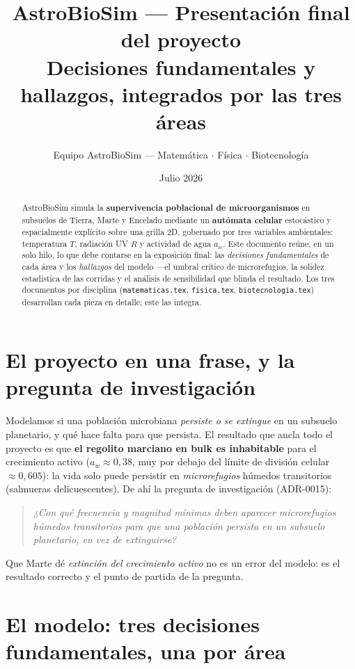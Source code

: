 \documentclass[11pt]{article}
\title{\textbf{AstroBioSim — Presentación final del proyecto}\\[3pt]
\large Decisiones fundamentales y hallazgos, integrados por las tres áreas}
\author{Equipo AstroBioSim — Matemática $\cdot$ Física $\cdot$ Biotecnología}
\date{Julio 2026}
\begin{document}
\maketitle

\begin{abstract}
\noindent AstroBioSim simula la \textbf{supervivencia poblacional de
microorganismos} en subsuelos de Tierra, Marte y Encelado mediante un
\textbf{autómata celular} estocástico y espacialmente explícito sobre una grilla
2D, gobernado por tres variables ambientales: temperatura $T$, radiación UV $R$ y
actividad de agua $a_w$. Este documento reúne, en un solo hilo, lo que debe
contarse en la exposición final: las \emph{decisiones fundamentales} de cada área
y los \emph{hallazgos} del modelo —el umbral crítico de microrefugios, la solidez
estadística de las corridas y el análisis de sensibilidad que blinda el resultado.
Los tres documentos por disciplina (\texttt{matematicas.tex}, \texttt{fisica.tex},
\texttt{biotecnologia.tex}) desarrollan cada pieza en detalle; este las integra.
\end{abstract}

\section{El proyecto en una frase, y la pregunta de investigación}

Modelamos si una población microbiana \emph{persiste o se extingue} en un subsuelo
planetario, y qué hace falta para que persista. El resultado que ancla todo el
proyecto es que \textbf{el regolito marciano en bulk es inhabitable} para el
crecimiento activo ($a_w\approx 0{,}38$, muy por debajo del límite de división
celular $\approx 0{,}605$): la vida solo puede persistir en \emph{microrefugios}
húmedos transitorios (salmueras delicuescentes). De ahí la pregunta de
investigación (ADR-0015):

\begin{quote}\itshape
¿Con qué frecuencia y magnitud mínimas deben aparecer microrefugios húmedos
transitorios para que una población persista en un subsuelo planetario, en vez de
extinguirse?
\end{quote}

\noindent Que Marte dé \emph{extinción del crecimiento activo} no es un error del
modelo: es el resultado correcto y el punto de partida de la pregunta.

\section{El modelo: tres decisiones fundamentales, una por área}
\end{document}
